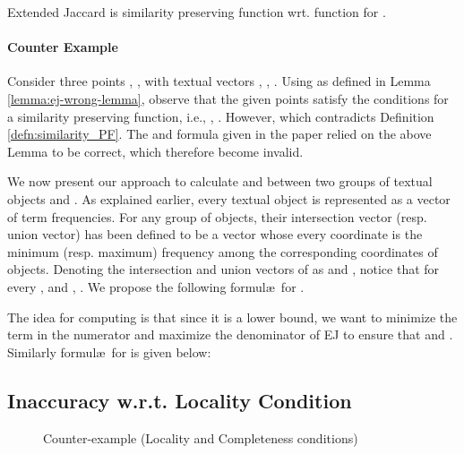 \documentclass[prodmode,letterpaper]{acmsmall}
\begin{document}
\begin{lemma}\cite{lu2011reverse}
    \label{lemma:ej-wrong-lemma}
    Extended Jaccard is similarity preserving function wrt. function  for .
\end{lemma}


\paragraph{Counter Example}
Consider three points , ,  with textual vectors , , .
Using  as defined in Lemma \ref{lemma:ej-wrong-lemma},
observe that the given points satisfy 
the conditions for a similarity preserving
function, i.e., , . 
However,  which contradicts Definition
\ref{defn:similarity_PF}. The  and  formula given in the paper relied
on the above Lemma to be correct, which therefore become invalid.


We now present our approach to calculate  and  between two groups of
textual objects  and .
As explained earlier, every textual object is represented as a vector of term
frequencies. For any group of objects, their intersection vector (resp. union
vector) has been defined to be a vector whose every coordinate is the minimum (resp. maximum)
frequency among the corresponding coordinates of objects. Denoting the
intersection and union vectors of  as 
and , notice that for every , and
, . 
We propose the following formul\ae\ for .

The idea for computing  is that since it is a lower bound, we want to
minimize the term in the numerator and maximize the denominator of EJ to ensure
that  and .
Similarly formul\ae\ for  is given below:



\subsection{Inaccuracy w.r.t. Locality Condition}\label{subsec:locality}
\begin{figure}[!htb]
\begin{center}
\caption{\small Counter-example (Locality and Completeness conditions)
\label{fig:counter-ex}
 } 
\end{center}
\end{figure}
\end{document}
